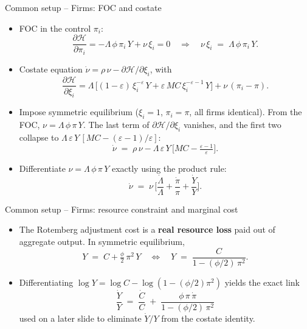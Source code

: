 \documentclass[11pt,aspectratio=169]{beamer}
\begin{document}
\begin{frame}{Common setup -- Firms: FOC and costate}

\begin{itemize}

\item FOC in the control $\pi_i$:
  \[
  \frac{\partial\mathcal H}{\partial\pi_i}
  = -\Lambda\,\phi\,\pi_i\,Y + \nu\,\xi_i = 0
  \quad\Longrightarrow\quad
  \nu\,\xi_i \;=\; \Lambda\,\phi\,\pi_i\,Y.
  \]

\item Costate equation
  $\dot\nu = \rho\,\nu - \partial\mathcal H / \partial\xi_i$, with
  \[
  \frac{\partial\mathcal H}{\partial\xi_i}
  = \Lambda\,\big[(1-\varepsilon)\,\xi_i^{-\varepsilon}\,Y
  + \varepsilon\,MC\,\xi_i^{-\varepsilon-1}\,Y\big]
  + \nu\,(\pi_i - \pi).
  \]

\item Impose symmetric equilibrium ($\xi_i = 1$, $\pi_i = \pi$, all
  firms identical). From the FOC, $\nu = \Lambda\,\phi\,\pi\,Y$. The
  last term of $\partial\mathcal H/\partial\xi_i$ vanishes, and the
  first two collapse to $\Lambda\,\varepsilon\,Y\,[MC - (\varepsilon-1)/\varepsilon]$:
  \[
  \dot\nu \;=\; \rho\,\nu - \Lambda\,\varepsilon\,Y\,
  \big[MC - \tfrac{\varepsilon-1}{\varepsilon}\big].
  \]

\item Differentiate $\nu = \Lambda\,\phi\,\pi\,Y$ exactly using the
  product rule:
  \[
  \dot\nu \;=\; \nu\,\Big[\frac{\dot\Lambda}{\Lambda}
  + \frac{\dot\pi}{\pi} + \frac{\dot Y}{Y}\Big].
  \]

\end{itemize}

\end{frame}

\begin{frame}{Common setup -- Firms: resource constraint and marginal cost}

\begin{itemize}

\item The Rotemberg adjustment cost is a \textbf{real resource loss}
  paid out of aggregate output. In symmetric equilibrium,
  \[
  Y \;=\; C + \tfrac{\phi}{2}\,\pi^2\,Y
  \quad\Longleftrightarrow\quad
  Y \;=\; \frac{C}{1 - (\phi/2)\,\pi^2}.
  \]

\item Differentiating $\log Y = \log C - \log(1 - (\phi/2)\pi^2)$
  yields the exact link
  \[
  \boxed{\frac{\dot Y}{Y} \;=\; \frac{\dot C}{C}
  \;+\; \frac{\phi\,\pi\,\dot\pi}{1 - (\phi/2)\,\pi^2}}
  \]
  used on a later slide to eliminate $\dot Y/Y$ from the costate
  identity.

\end{itemize}

\end{frame}
\end{document}
